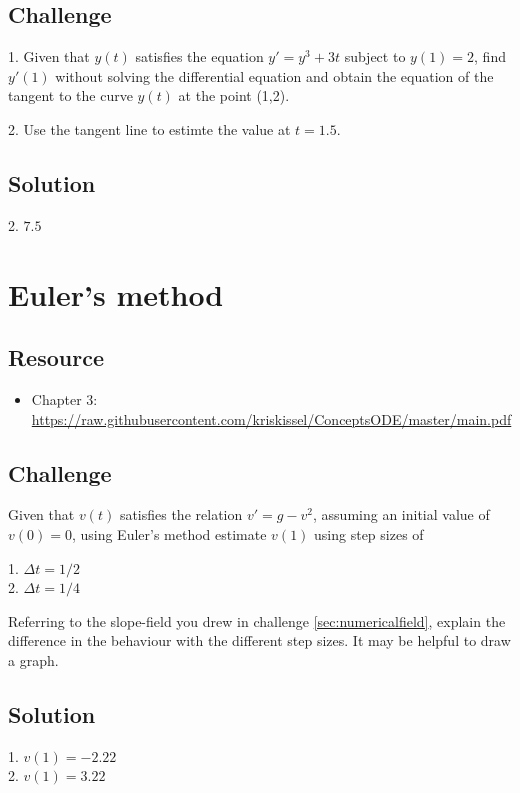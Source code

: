 \subsection*{Challenge}
1. Given that $y(t)$ satisfies the equation $y' = y^3 + 3t$ subject to $y(1) = 2$, find $y'(1)$ without solving the differential equation and obtain the equation of the tangent to the curve $y(t)$ at the point (1,2).

2. Use the tangent line to estimte the value at $t = 1.5$.

\subsection*{Solution}
2. $7.5$




\newpage
\section{Euler's method}
\label{sec:euler}

\subsection*{Resource}
\begin{itemize}
    \item Chapter 3: \url{https://raw.githubusercontent.com/kriskissel/ConceptsODE/master/main.pdf}
\end{itemize}

\subsection*{Challenge}
Given that $v(t)$ satisfies the relation $v' = g - v^2$, assuming an initial value of $v(0)=0$, using Euler's method estimate $v(1)$ using step sizes of

1. $\Delta t = 1/2$\\
2. $\Delta t = 1/4$

Referring to the slope-field you drew in challenge \ref{sec:numericalfield}, explain the difference in the behaviour with the different step sizes. It may be helpful to draw a graph.

\subsection*{Solution}
1. $v(1) = -2.22$\\
2. $v(1) = 3.22$



